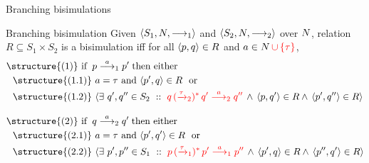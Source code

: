 \documentclass[aspectratio=169]{beamer}
\begin{document}
\begin{slide}{Branching bisimulations}
\small
{}


\begin{block}{Branching bisimulation}
Given  $\mathopen{\langle}S_1, N,  \longrightarrow_1\mathclose{\rangle}$  and $\mathopen{\langle}S_2, N, \longrightarrow_2\mathclose{\rangle}$ over $N$,
relation $R \subseteq S_1 \times S_2$ is a \alert{bisimulation} iff for all $\mathopen{\langle}p,q\mathclose{\rangle} \in R$ and $a \in N\,\textcolor{red}{\cup\left\{ \tau \right\}}$,
%
\begin{align*}\small
&\text{\structure{(1)} if}\; \;   p \rtran{a}_1 p'\; \text{then either}
  \\&~~
  \text{\structure{(1.1)}~} a=\tau \text{~and~}\pair{p',q}\in R \text{~~or}
  \\&~~
  \text{\structure{(1.2)}~}
    \rcb{\exists}{q',q'' \in S_2}{}{\rdb{q \,(\trans{\tau}_2)^{*}\,q' \tran{a}_2  q''}\, \e\,
    \pair{p,q'} \in R \e\,
    \pair{p',q''} \in R} \\[3mm]
&\text{\structure{(2)} if}\; \;   q \rtran{a}_2 q'\; \text{then either}
  \\&~~
  \text{\structure{(2.1)}~} a=\tau \text{~and~}\pair{p',q'}\in R \text{~~or}
  \\&~~
  \text{\structure{(2.2)}~}
    \rcb{\exists}{p',p'' \in S_1}{}{\rdb{p \,(\trans{\tau}_1)^{*}\,p' \tran{a}_1  p''}\, \e\,
    \pair{p',q} \in R \e\,
    \pair{p'',q'} \in R}
\end{align*}
\end{block}
\end{slide}
\end{document}
